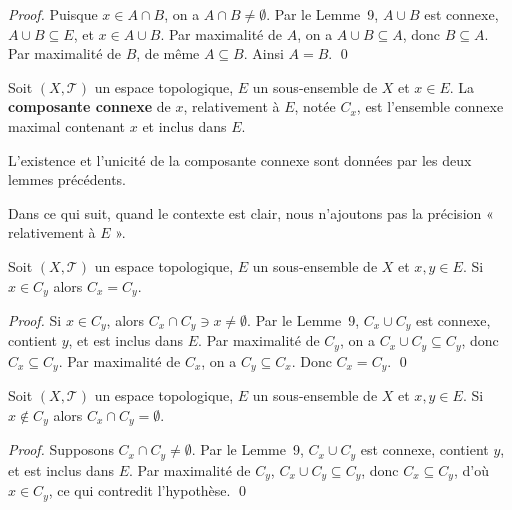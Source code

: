 \begin{proof}
Puisque $x \in A \cap B$, on a $A \cap B \neq \emptyset$. Par le Lemme~9,
$A \cup B$ est connexe, $A \cup B \subseteq E$, et $x \in A \cup B$.
Par maximalité de $A$, on a $A \cup B \subseteq A$, donc $B \subseteq A$.
Par maximalité de $B$, de même $A \subseteq B$. Ainsi $A = B$. \qed
\end{proof}


\begin{definition}
Soit $(X, \mathcal{T})$ un espace topologique, $E$ un sous-ensemble de $X$ et
$x \in E$. La \textbf{composante connexe} de $x$, relativement à $E$, notée $C_x$,
est l'ensemble connexe maximal contenant $x$ et inclus dans $E$.

\medskip
L'existence et l'unicité de la composante connexe sont données par les deux
lemmes précédents.
\end{definition}

\medskip
Dans ce qui suit, quand le contexte est clair, nous n'ajoutons pas la précision
« relativement à $E$ ».


\begin{lemme}
Soit $(X, \mathcal{T})$ un espace topologique, $E$ un sous-ensemble de $X$ et
$x, y \in E$. Si $x \in C_y$ alors $C_x = C_y$.
\end{lemme}

\begin{proof}
Si $x \in C_y$, alors $C_x \cap C_y \ni x \neq \emptyset$. Par le Lemme~9,
$C_x \cup C_y$ est connexe, contient $y$, et est inclus dans $E$. Par maximalité
de $C_y$, on a $C_x \cup C_y \subseteq C_y$, donc $C_x \subseteq C_y$. Par
maximalité de $C_x$, on a $C_y \subseteq C_x$. Donc $C_x = C_y$. \qed
\end{proof}


\begin{lemme}
Soit $(X, \mathcal{T})$ un espace topologique, $E$ un sous-ensemble de $X$ et
$x, y \in E$. Si $x \notin C_y$ alors $C_x \cap C_y = \emptyset$.
\end{lemme}

\begin{proof}
Supposons $C_x \cap C_y \neq \emptyset$. Par le Lemme~9, $C_x \cup C_y$ est
connexe, contient $y$, et est inclus dans $E$. Par maximalité de $C_y$,
$C_x \cup C_y \subseteq C_y$, donc $C_x \subseteq C_y$, d'où $x \in C_y$,
ce qui contredit l'hypothèse. \qed
\end{proof}

